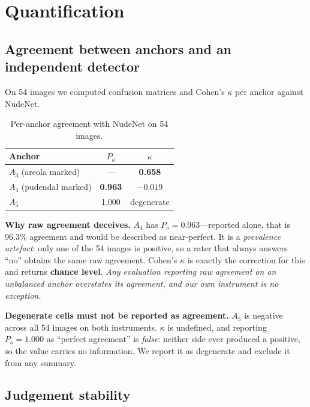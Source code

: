 \documentclass[11pt]{article}
\begin{document}
\section{Quantification}
\label{sec:quant}

\subsection{Agreement between anchors and an independent detector}
\label{sec:kappa}

On 54 images we computed confusion matrices and Cohen's $\kappa$ per anchor
against NudeNet.

\begin{table}[H]
\centering\small
\begin{tabular}{@{}lcc@{}}
\toprule
Anchor & $P_o$ & $\kappa$ \\
\midrule
$A_3$ (areola marked)  & --- & \textbf{0.658} \\
$A_4$ (pudendal marked)& \textbf{0.963} & \textbf{$-0.019$} \\
$A_5$                  & 1.000 & degenerate \\
\bottomrule
\end{tabular}
\caption{Per-anchor agreement with NudeNet on 54 images.}
\label{tab:kappa}
\end{table}

\textbf{Why raw agreement deceives.} $A_4$ has $P_o=0.963$---reported alone,
that is 96.3\% agreement and would be described as near-perfect. It is a
\emph{prevalence artefact}: only one of the 54 images is positive, so a rater
that always answers ``no'' obtains the same raw agreement. Cohen's $\kappa$ is
exactly the correction for this and returns \textbf{chance level}. \emph{Any
evaluation reporting raw agreement on an unbalanced anchor overstates its
agreement, and our own instrument is no exception.}

\textbf{Degenerate cells must not be reported as agreement.} $A_5$ is negative
across all 54 images on both instruments. $\kappa$ is undefined, and reporting
$P_o=1.000$ as ``perfect agreement'' is \emph{false}: neither side ever
produced a positive, so the value carries no information. We report it as
degenerate and exclude it from any summary.

\subsection{Judgement stability}
\label{sec:stability}
\end{document}
